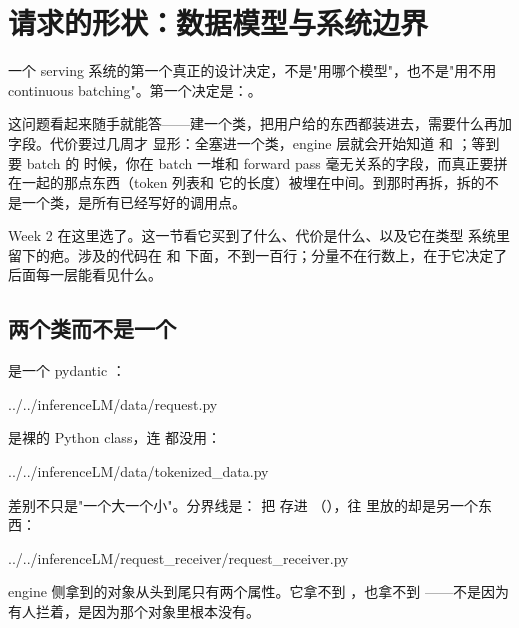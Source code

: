 \section{请求的形状：数据模型与系统边界}
\label{sec:a-shape}

一个 serving 系统的第一个真正的设计决定，不是"用哪个模型"，也不是"用不用 continuous
batching"。第一个决定是：。

这问题看起来随手就能答——建一个类，把用户给的东西都装进去，需要什么再加字段。代价要过几周才
显形：全塞进一个类，engine 层就会开始知道  和 ；等到要 batch 的
时候，你在 batch 一堆和 forward pass 毫无关系的字段，而真正要拼在一起的那点东西（token 列表和
它的长度）被埋在中间。到那时再拆，拆的不是一个类，是所有已经写好的调用点。

Week 2 在这里选了。这一节看它买到了什么、代价是什么、以及它在类型
系统里留下的疤。涉及的代码在  和 
下面，不到一百行；分量不在行数上，在于它决定了后面每一层能看见什么。

\subsection{两个类而不是一个}
\label{sec:a-shape-two-classes}

 是一个 pydantic ：

%
  {../../inferenceLM/data/request.py}

 是裸的 Python class，连  都没用：

%
  {../../inferenceLM/data/tokenized_data.py}

差别不只是"一个大一个小"。分界线是： 把
 存进 
（），往 
里放的却是另一个东西：

%
  {../../inferenceLM/request_receiver/request_receiver.py}

engine 侧拿到的对象从头到尾只有两个属性。它拿不到 ，也拿不到 
——不是因为有人拦着，是因为那个对象里根本没有。

